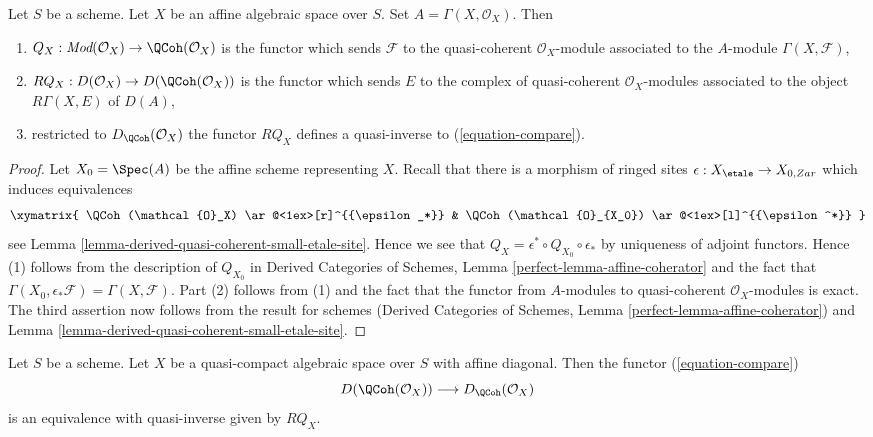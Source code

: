 \begin{lemma}
\label{lemma-affine-coherator}
Let $S$ be a scheme. Let $X$ be an affine algebraic space over $S$.
Set $A = \Gamma(X, \mathcal{O}_X)$. Then
\begin{enumerate}
\item $Q_X : \textit{Mod}(\mathcal{O}_X) \to \QCoh(\mathcal{O}_X)$
is the functor
which sends $\mathcal{F}$ to the quasi-coherent $\mathcal{O}_X$-module
associated to the $A$-module $\Gamma(X, \mathcal{F})$,
\item $RQ_X : D(\mathcal{O}_X) \to D(\QCoh(\mathcal{O}_X))$
is the functor which sends $E$ to the complex of quasi-coherent
$\mathcal{O}_X$-modules associated to the object $R\Gamma(X, E)$ of $D(A)$,
\item restricted to $D_\QCoh(\mathcal{O}_X)$ the functor
$RQ_X$ defines a quasi-inverse to (\ref{equation-compare}).
\end{enumerate}
\end{lemma}

\begin{proof}
Let $X_0 = \Spec(A)$ be the affine scheme representing $X$.
Recall that there is a morphism of ringed sites
$\epsilon : X_\etale \to X_{0, Zar}$
which induces equivalences
$$
\xymatrix{
\QCoh(\mathcal{O}_X) \ar@<1ex>[r]^{{\epsilon_*}} &
\QCoh(\mathcal{O}_{X_0}) \ar@<1ex>[l]^{{\epsilon^*}}
}
$$
see Lemma
\ref{lemma-derived-quasi-coherent-small-etale-site}.
Hence we see that $Q_X = \epsilon^* \circ Q_{X_0} \circ \epsilon_*$
by uniqueness of adjoint functors. Hence (1) follows from
the description of $Q_{X_0}$ in
Derived Categories of Schemes, Lemma \ref{perfect-lemma-affine-coherator}
and the fact that
$\Gamma(X_0, \epsilon_*\mathcal{F}) = \Gamma(X, \mathcal{F})$.
Part (2) follows from (1) and the fact that the functor
from $A$-modules to quasi-coherent $\mathcal{O}_X$-modules is exact.
The third assertion now follows from the result for schemes
(Derived Categories of Schemes, Lemma \ref{perfect-lemma-affine-coherator})
and Lemma
\ref{lemma-derived-quasi-coherent-small-etale-site}.
\end{proof}

\begin{proposition}
\label{proposition-quasi-compact-affine-diagonal}
Let $S$ be a scheme. Let $X$ be a quasi-compact algebraic space over $S$
with affine diagonal. Then the functor (\ref{equation-compare})
$$
D(\QCoh(\mathcal{O}_X))
\longrightarrow
D_\QCoh(\mathcal{O}_X)
$$
is an equivalence with quasi-inverse given by $RQ_X$.
\end{proposition}

